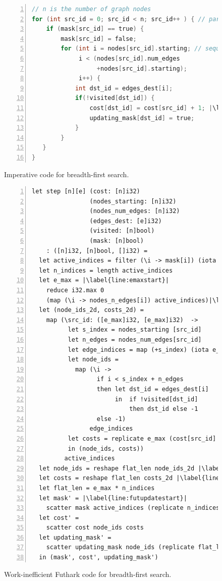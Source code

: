 \begin{figure}[ht]
\begin{lstlisting}[xleftmargin=0pt,language=C,numbers=left,escapechar=|]
// n is the number of graph nodes
for (int src_id = 0; src_id < n; src_id++ ) { // parallel
    if (mask[src_id] == true) {
        mask[src_id] = false;
        for (int i = nodes[src_id].starting; // sequential
             i < (nodes[src_id].num_edges
                  +nodes[src_id].starting);
             i++) {
            int dst_id = edges_dest[i];
            if(!visited[dst_id]) {
                cost[dst_id] = cost[src_id] + 1; |\label{line:seqcostupd}|
                updating_mask[dst_id] = true;
            }
        }
   }
}
\end{lstlisting}
  \caption{Imperative code for breadth-first search.}
  \label{fig:bfs-imperative}
\end{figure}

\begin{figure}[ht]
\small
\begin{lstlisting}[xleftmargin=0pt,language=futhark,numbers=left,escapechar=|]
let step [n][e] (cost: [n]i32)
                (nodes_starting: [n]i32)
                (nodes_num_edges: [n]i32)
                (edges_dest: [e]i32)
                (visited: [n]bool)
                (mask: [n]bool)
    : ([n]i32, [n]bool, []i32) =
  let active_indices = filter (\i -> mask[i]) (iota n)|\label{line:futfilter}|
  let n_indices = length active_indices
  let e_max = |\label{line:emaxstart}|
    reduce i32.max 0
    (map (\i -> nodes_n_edges[i]) active_indices)|\label{line:emaxend}|
  let (node_ids_2d, costs_2d) =
    map (\src_id: ([e_max]i32, [e_max]i32)  ->
          let s_index = nodes_starting [src_id]
          let n_edges = nodes_num_edges[src_id]
          let edge_indices = map (+s_index) (iota e_max)
          let node_ids =
            map (\i ->
                  if i < s_index + n_edges
                  then let dst_id = edges_dest[i]
                       in  if !visited[dst_id]
                           then dst_id else -1
                  else -1)
                edge_indices
          let costs = replicate e_max (cost[src_id] + 1)
          in (node_ids, costs))
         active_indices
  let node_ids = reshape flat_len node_ids_2d |\label{line:futflatstart}|
  let costs = reshape flat_len costs_2d |\label{line:futflatend}|
  let flat_len = e_max * n_indices
  let mask' = |\label{line:futupdatestart}|
    scatter mask active_indices (replicate n_indices false)
  let cost' =
    scatter cost node_ids costs
  let updating_mask' =
    scatter updating_mask node_ids (replicate flat_len true) |\label{line:futupdateend}|
  in (mask', cost', updating_mask')
\end{lstlisting}
  \caption{Work-inefficient Futhark code for breadth-first search.}
  \label{fig:bfs-fun-pad}
\end{figure}

